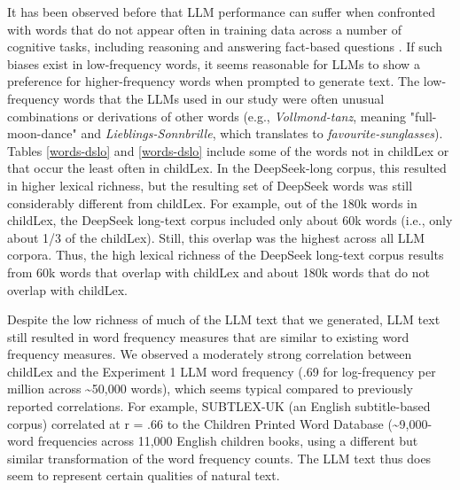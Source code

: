 \documentclass[doc, a4paper, anonymous]{apa7}
\begin{document}
It has been observed before that LLM performance can suffer when confronted with words that do not appear often in training data across a number of cognitive tasks, including reasoning \cite{razeghi_impact_2022} and answering fact-based questions \cite{kandpal_large_2023}. If such biases exist in low-frequency words, it seems reasonable for LLMs to show a preference for higher-frequency words when prompted to generate text. The low-frequency words that the LLMs used in our study were often unusual combinations or derivations of other words (e.g., \textit{Vollmond-tanz}, meaning "full-moon-dance" and \textit{Lieblings-Sonnbrille}, which translates to \textit{favourite-sunglasses}). Tables \ref{words-dslo} and \ref{words-dslo} include some of the words not in childLex or that occur the least often in childLex. In the DeepSeek-long corpus, this resulted in higher lexical richness, but the resulting set of DeepSeek words was still considerably different from childLex. For example, out of the 180k words in childLex, the DeepSeek long-text corpus included only about 60k words (i.e., only about 1/3 of the childLex). Still, this overlap was the highest across all LLM corpora. Thus, the high lexical richness of the DeepSeek long-text corpus results from 60k words that overlap with childLex and about 180k words that do not overlap with childLex.

Despite the low richness of much of the LLM text that we generated, LLM text still resulted in word frequency measures that are similar to existing word frequency measures. We observed a moderately strong correlation between childLex and the Experiment 1 LLM word frequency (.69 for log-frequency per million across \textasciitilde 50,000 words), which seems typical compared to previously reported correlations. For example, SUBTLEX-UK (an English subtitle-based corpus) correlated at r = .66 to the Children Printed Word Database (\textasciitilde 9,000-word frequencies across 11,000 English children books, \citep{van_heuven_subtlex-uk_2014} using a different but similar transformation of the word frequency counts. The LLM text thus does seem to represent certain qualities of natural text. 
\end{document}
